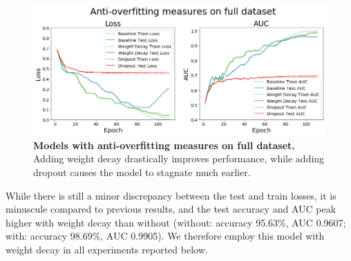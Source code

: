 \begin{figure}[!htb]
\centering
\includegraphics[width=\linewidth]{ch-results/figures/baseline/full_dataset_anti_overfitting.png}
\caption[Models with anti-overfitting measures on full dataset.]{{\bf Models with anti-overfitting measures on full dataset.} Adding weight decay drastically improves performance, while adding dropout causes the model to stagnate much earlier.}
\label{fig:results-baseline-anti-overfitting}
\end{figure}

While there is still a minor discrepancy between the test and train losses, it is minuscule compared to previous results, and the test accuracy and AUC peak higher with weight decay than without (without: accuracy 95.63\%, AUC 0.9607; with: accuracy 98.69\%, AUC 0.9905). We therefore employ this model with weight decay in all experiments reported below.

